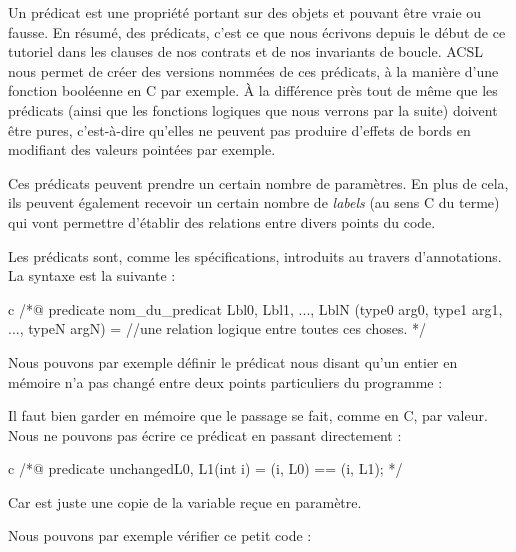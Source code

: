 Un prédicat est une propriété portant sur des objets et pouvant être vraie ou
fausse. En résumé, des prédicats, c'est ce que nous écrivons depuis le début de
ce tutoriel dans les clauses de nos contrats et de nos invariants de boucle.
ACSL nous permet de créer des versions nommées de ces prédicats, à la manière
d'une fonction booléenne en C par exemple. À la différence près tout de même que
les prédicats (ainsi que les fonctions logiques que nous verrons par la suite)
doivent être pures, c'est-à-dire qu'elles ne peuvent pas produire d'effets de
bords en modifiant des valeurs pointées par exemple.



Ces prédicats peuvent prendre un certain nombre de paramètres. En plus de cela,
ils peuvent également recevoir un certain nombre de \textit{labels} (au sens C du terme)
qui vont permettre d'établir des relations entre divers points du code.





Les prédicats sont, comme les spécifications, introduits au travers
d'annotations. La syntaxe est la suivante :



\begin{CodeBlock}{c}
  /*@
  predicate nom_du_predicat { Lbl0, Lbl1, ..., LblN }(type0 arg0, type1 arg1, ..., typeN argN) =
  //une relation logique entre toutes ces choses.
  */
\end{CodeBlock}



Nous pouvons par exemple définir le prédicat nous disant qu'un entier en mémoire n'a
pas changé entre deux points particuliers du programme :




\begin{Warning}
  Il faut bien garder en mémoire que le passage se fait, comme en C, par valeur.
  Nous ne pouvons pas écrire ce prédicat en passant directement  :

  \begin{CodeBlock}{c}
    /*@
    predicate unchanged{L0, L1}(int i) =
    \at(i, L0) == \at(i, L1);
    */
  \end{CodeBlock}

  Car  est juste une copie de la variable reçue en paramètre.
\end{Warning}


Nous pouvons par exemple vérifier ce petit code :


